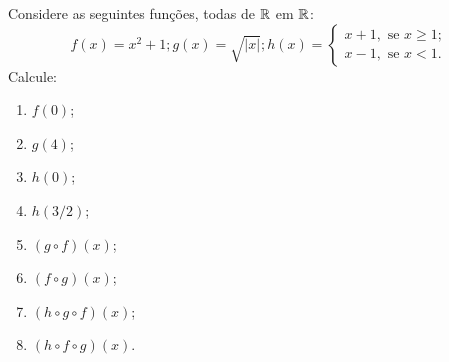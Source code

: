 Considere as seguintes funções, todas de $\mathbb{R}$ em $\mathbb{R}$:
\[
	f(x)=x^2+1;g(x)=\sqrt{|x|};h(x)=\left\{\begin{array}{l} x+1,\mbox{ se $x\geq 1$};\\ x-1,\mbox{ se $x<1$}.\end{array}\right.
\]
Calcule:
\begin{enumerate}
	\item $f(0)$;
	\item $g(4)$;
	\item $h(0)$;
	\item $h(3/2)$;
	\item $(g\circ f)(x)$;
	\item $(f\circ g)(x)$;
	\item $(h\circ g\circ f)(x)$;
	\item $(h\circ f\circ g)(x)$.
\end{enumerate}
